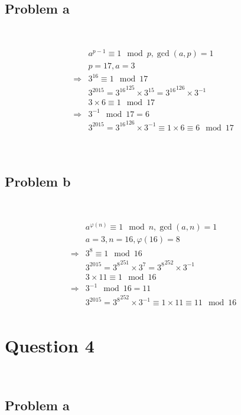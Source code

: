\documentclass{article}
\begin{document}
~

\subsection*{Problem a }

~

\begin{align*}
    &a^{p-1}\equiv 1\mod p,\gcd(a,p)=1\\
    &p=17,a=3\\
    \Rightarrow&3^{16}\equiv 1\mod 17\\
    &3^{2015}={3^{16}}^{125}\times 3^15={3^{16}}^{126}\times 3^{-1}\\
    &3\times 6\equiv 1\mod 17\\
    \Rightarrow&3^{-1}\mod 17=6\\
    &3^{2015}={3^{16}}^{126}\times 3^{-1}\equiv 1\times 6\equiv 6\mod 17\\
\end{align*}

~

\subsection*{Problem b}

~

\begin{align*}
    &a^{\varphi(n)}\equiv 1\mod n,\gcd(a,n)=1\\
    &a=3,n=16,\varphi(16)=8\\
    \Rightarrow&3^8\equiv1\mod 16\\
    &3^{2015}={3^{8}}^{251}\times 3^7={3^{8}}^{252}\times 3^{-1}\\
    &3\times 11\equiv 1\mod 16\\
    \Rightarrow&3^{-1}\mod 16= 11\\
    &3^{2015}={3^{8}}^{252}\times 3^{-1}\equiv 1\times 11\equiv 11\mod 16\\
\end{align*}

\newpage

\section*{Question 4}

~

\subsection*{Problem a}
\end{document}
